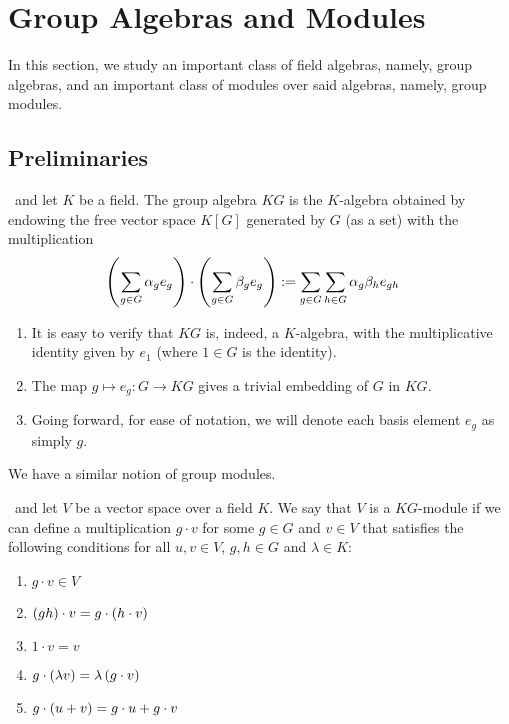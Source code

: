 \section{Group Algebras and Modules}

In this section, we study an important class of field algebras, namely, group algebras, and an important class of modules over said algebras, namely, group modules.

\subsection{Preliminaries}

\begin{boxdefinition}
    \ and let $K$ be a field. The group algebra $KG$ is the $K$-algebra obtained by endowing the free vector space $K[G]$ generated by $G$ (as a set) with the multiplication
    \begin{align*}
        \left( \sum_{g \in G} \alpha_g e_g \right) \cdot \left( \sum_{g \in G} \beta_g e_g \right) &:= \sum_{g \in G} \sum_{h \in G} \alpha_{g} \beta_h e_{gh}
    \end{align*}
\end{boxdefinition}
\begin{remark} \hfill
    \begin{enumerate}[noitemsep]
        \item It is easy to verify that $KG$ is, indeed, a $K$-algebra, with the multiplicative identity given by $e_1$ (where $1 \in G$ is the identity).
        \item The map $g \mapsto e_g : G \to KG$ gives a trivial embedding of $G$ in $KG$.
        \item Going forward, for ease of notation, we will denote each basis element $e_g$ as simply $g$.
    \end{enumerate}
\end{remark}

We have a similar notion of group modules.

\begin{boxdefinition} \label{Ch1:Def:KG-Module}
    \ and let $V$ be a vector space over a field $K$. We say that $V$ is a $KG$-module if we can define a multiplication $g \cdot v$ for some $g \in G$ and $v \in V$ that satisfies the following conditions for all $u, v \in V$, $g, h \in G$ and $\lambda \in K$:
    \begin{enumerate}[noitemsep]
        \item $g \cdot v \in V$
        \item $\left( gh \right) \cdot v = g \cdot \left( h \cdot v \right)$
        \item $1 \cdot v = v$
        \item $g \cdot \left( \lambda v \right) = \lambda \left( g \cdot v \right)$
        \item $g \cdot \left( u + v \right) = g \cdot u + g \cdot v$
    \end{enumerate}
\end{boxdefinition}

